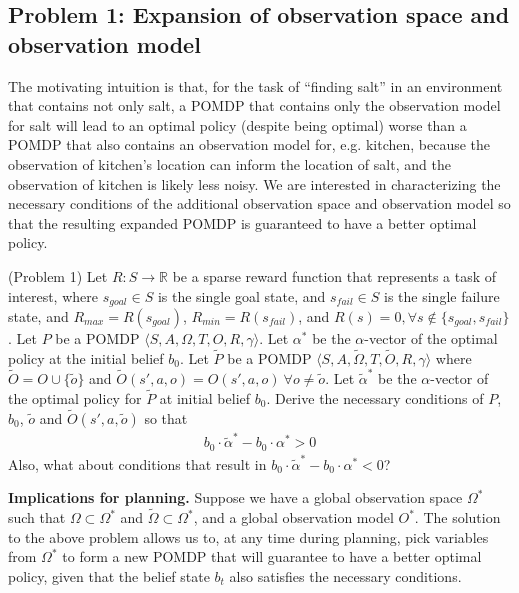 \documentclass{article}
\newcommand{\td}[1]{\tilde{#1}}
\begin{document}
\subsection{Problem 1: Expansion of observation space and observation model}

The motivating intuition is that, for the task of ``finding salt'' in an environment that contains not only salt, a POMDP that contains only the observation model for salt will lead to an optimal policy (despite being optimal) worse than a POMDP that also contains an observation model for, e.g. kitchen, because the observation of kitchen's location can inform the location of salt, and the observation of kitchen is likely less noisy. We are interested in characterizing the necessary conditions of the additional observation space and observation model so that the resulting expanded POMDP is guaranteed to have a better optimal policy.

\begin{definition}(Problem 1)
Let $R:S\rightarrow \mathbb{R}$ be a sparse reward function that represents a task of interest, where $s_{goal}\in S$ is the single goal state, and $s_{fail}\in S$ is the single failure state, and $R_{max}=R(s_{goal})$, $R_{min}=R(s_{fail})$, and $R(s)=0, \forall s \not\in\{s_{goal},s_{fail}\}$. Let $P$ be a POMDP $\langle S, A, \Omega, T, O, R, \gamma  \rangle$. Let $\alpha^*$ be the $\alpha$-vector of the optimal policy at the initial belief $b_0$. Let $\td{P}$ be a POMDP $\langle S, A, \td{\Omega}, T, \td{O}, R, \gamma  \rangle$ where $\td{O}=O\cup\{\td{o}\}$ and $\td{O}(s',a,o)=O(s',a,o)\ \forall o\neq \td{o}$. Let $\td{\alpha}^*$ be the $\alpha$-vector of the optimal policy for $\td{P}$ at initial belief $b_0$. Derive the necessary conditions of $P$, $b_0$, $\td{o}$ and $\td{O}(s',a,\td{o})$ so that
\begin{align}
b_0\cdot \td{\alpha}^* - b_0\cdot \alpha^* > 0
\end{align}
Also, what about conditions that result in $b_0\cdot \td{\alpha}^* - b_0\cdot \alpha^* < 0$?
\end{definition}

\noindent \textbf{Implications for planning.} Suppose we have a global observation space $\Omega^*$ such that $\Omega \subset \Omega^*$ and $\td{\Omega} \subset \Omega^*$, and a global observation model $O^*$. The solution to the above problem allows us to, at any time during planning, pick variables from $\Omega^*$ to form a new POMDP that will guarantee to have a better optimal policy, given that the belief state $b_t$ also satisfies the necessary conditions.
\end{document}

